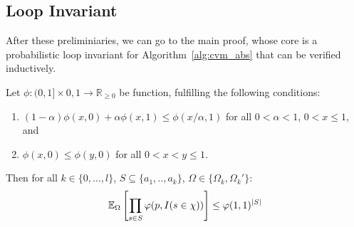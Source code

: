 \subsection{Loop Invariant}
After these preliminiaries, we can go to the main proof, whose core is a probabilistic loop
invariant for Algorithm~\ref{alg:cvm_abs} that can be verified inductively.

\begin{lemma}
\label{le:neg_cor_prelim}
Let $\phi : (0,1] \times {0,1} \rightarrow \mathbb R_{\geq 0}$ be function, fulfilling the following
  conditions:
\begin{enumerate}
\item \label{cond:phi_1} $(1-\alpha) \phi(x,0) + \alpha \phi(x,1) \leq \phi(x/\alpha,1)$ for all
  $0 < \alpha < 1$, $0 < x \leq 1$, and
\item \label{cond:phi_2} $\phi(x,0) \leq \phi(y,0)$ for all $0 < x < y \leq 1$.
\end{enumerate}
Then for all 
$k \in \{0,\ldots,l\}$, $S \subseteq \{a_1,..,a_k\}$, $\Omega \in \{\Omega_k,\Omega_k'\}$:
\[
  \operatorname{\mathbb E}_{\Omega}\left[ \prod_{s \in S} \varphi(p, I(s \in \chi)) \right] \leq \varphi(1,1)^{|S|} 
\]
\end{lemma}
